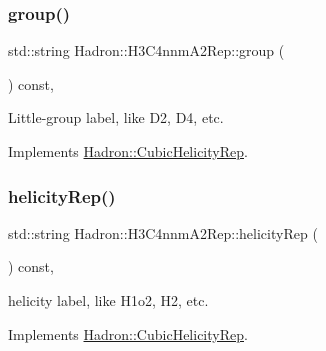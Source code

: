 \mbox{\label{structHadron_1_1H3C4nnmA2Rep_a057eae346cf6d906b23501bceef95e9b}} 
\subsubsection{\texorpdfstring{group()}{group()}\hspace{0.1cm}{\footnotesize\ttfamily [5/5]}}
{\footnotesize\ttfamily std\+::string Hadron\+::\+H3\+C4nnm\+A2\+Rep\+::group (\begin{DoxyParamCaption}{ }\end{DoxyParamCaption}) const\hspace{0.3cm}{\ttfamily [inline]}, {\ttfamily [virtual]}}

Little-\/group label, like D2, D4, etc. 

Implements \mbox{\hyperlink{structHadron_1_1CubicHelicityRep_a101a7d76cd8ccdad0f272db44b766113}{Hadron\+::\+Cubic\+Helicity\+Rep}}.

\mbox{\label{structHadron_1_1H3C4nnmA2Rep_acabc462818e030ca95a03f9ecf996e35}} 
\subsubsection{\texorpdfstring{helicityRep()}{helicityRep()}\hspace{0.1cm}{\footnotesize\ttfamily [1/3]}}
{\footnotesize\ttfamily std\+::string Hadron\+::\+H3\+C4nnm\+A2\+Rep\+::helicity\+Rep (\begin{DoxyParamCaption}{ }\end{DoxyParamCaption}) const\hspace{0.3cm}{\ttfamily [inline]}, {\ttfamily [virtual]}}

helicity label, like H1o2, H2, etc. 

Implements \mbox{\hyperlink{structHadron_1_1CubicHelicityRep_af1096946b7470edf0a55451cc662f231}{Hadron\+::\+Cubic\+Helicity\+Rep}}.

\mbox{\label{structHadron_1_1H3C4nnmA2Rep_acabc462818e030ca95a03f9ecf996e35}} 
